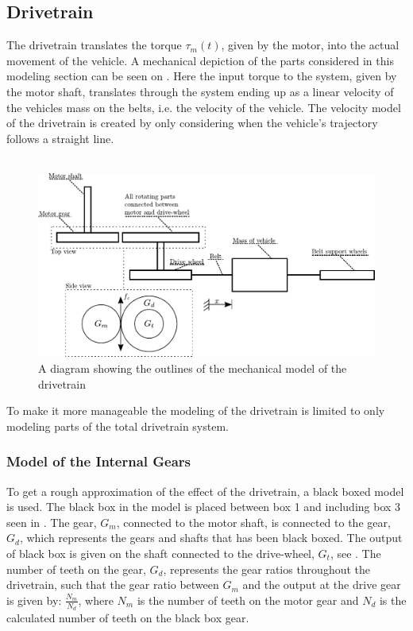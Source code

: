 \subsection{Drivetrain}\label{DriveTrain}
The drivetrain translates the torque $\tau_m(t)$, given by the motor, into the actual movement of the vehicle. A mechanical depiction of the parts considered in this modeling section can be seen on . Here the input torque to the system, given by the motor shaft, translates through the system ending up as a linear velocity of the vehicles mass on the belts, i.e. the velocity of the vehicle. The velocity model of the drivetrain is created by only considering when the vehicle's trajectory follows a straight line.\\\\

\begin{figure}[H]
	\centering
	\includegraphics[scale=0.8]{figures/mechanicalDrawingSystem.pdf}
	\caption{A diagram showing the outlines of the mechanical model of the drivetrain}
	\label{fig:DrivetrainMechanicalModel}
\end{figure}

To make it more manageable the modeling of the drivetrain is limited to only modeling parts of the total drivetrain system.

\subsubsection{Model of the Internal Gears}\label{BlackBoxModel}
To get a rough approximation of the effect of the drivetrain, a black boxed model is used. The black box in the model is placed between box 1 and including box 3 seen in . The gear, $G_m$, connected to the motor shaft, is connected to the gear, $G_d$, which represents the gears and shafts that has been black boxed. The output of black box is given on the shaft connected to the drive-wheel, $G_t$, see . The number of teeth on the gear, $G_d$, represents the gear ratios throughout the drivetrain, such that the gear ratio between $G_m$ and the output at the drive gear is given by: $\frac{N_m}{N_d}$, where $N_m$ is the number of teeth on the motor gear and $N_d$ is the calculated number of teeth on the black box gear.

